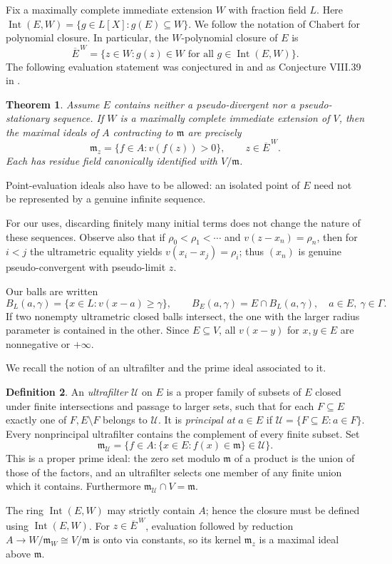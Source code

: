 \documentclass[11pt]{amsart}
\newtheorem{theorem}{Theorem}[section]
\theoremstyle{definition}
\newtheorem{definition}[theorem]{Definition}
\theoremstyle{remark}
\newcommand{\Int}{\operatorname{Int}}
\newcommand{\m}{\mathfrak m}
\newcommand{\U}{\mathcal U}
\newcommand{\g}{\Gamma}
\newcommand{\barE}{\overline E^{\,W}}
\begin{document}
Fix a maximally complete immediate extension $W$ with fraction field
$L$. Here
$\Int(E,W)=\{g\in L[X]:g(E)\subseteq W\}$.
We follow the notation of Chabert \cite[Definition~VII.1]{Chabert2025} for polynomial closure. In particular,
the $W$-polynomial closure of $E$ is
\[
\overline E^{\,W}=\{z\in W:g(z)\in W\text{ for all }
g\in\Int(E,W)\}.
\]
The following evaluation statement was conjectured in
\cite[\S3]{BoulangerChabert2020}
and as Conjecture VIII.39 in \cite{Chabert2025}.
\begin{theorem}\label{thm:valuation-main}
Assume $E$ contains neither a pseudo-divergent nor a
pseudo-stationary sequence. If $W$ is a maximally complete
immediate extension of $V$, then the maximal ideals of $A$
contracting to $\mathfrak m$ are precisely
\[
\mathfrak m_z=\{f\in A:v(f(z))>0\},\qquad z\in\overline E^{\,W}.
\]
Each has residue field canonically identified with $V/\mathfrak m$.
\end{theorem}
Point-evaluation ideals also have to be allowed: an isolated point
of $E$ need not be represented by a genuine infinite sequence.




For our uses, discarding finitely many initial terms does not change the nature of these sequences. Observe also that if $\rho_0<\rho_1<\cdots$ and $v(z-x_n)=\rho_n$, then for $i<j$ the ultrametric equality yields $v(x_i-x_j)=\rho_i$; thus $(x_n)$ is genuine pseudo-convergent with pseudo-limit $z$.


Our balls are written
\[
 B_L(a,\gamma)=\{x\in L:v(x-a)\geq\gamma\},\qquad
 B_E(a,\gamma)=E\cap B_L(a,\gamma),\quad a\in E,\ \gamma\in\g.
\]
If two nonempty ultrametric closed balls intersect, the one with the larger radius parameter is contained in the other. Since $E\subseteq V$, all $v(x-y)$ for $x,y\in E$ are nonnegative or $+\infty$.


We recall the notion of an ultrafilter and the prime ideal associated to it.
\begin{definition}
An \emph{ultrafilter} $\U$ on $E$ is a proper family of subsets of $E$ closed under finite intersections and passage to larger sets, such that for each $F\subseteq E$ exactly one of $F,E\setminus F$ belongs to $\U$. It is \emph{principal at} $a\in E$ if $\U=\{F\subseteq E:a\in F\}$. Every nonprincipal ultrafilter contains the complement of every finite subset. Set
\[
 \m_{\U}=\bigl\{f\in A:\{x\in E:f(x)\in\m\}\in\U\bigr\}.
\]
This is a proper prime ideal: the zero set modulo $\m$ of a product is the union of those of the factors, and an ultrafilter selects one member of any finite union which it contains. Furthermore $\m_{\U}\cap V=\m$.
\end{definition}
The ring $\Int(E,W)$ may strictly contain $A$; hence the closure
must be defined using $\Int(E,W)$.
For $z\in\barE$, evaluation followed by reduction
$A\to W/\m_W\cong V/\m$ is onto via constants, so its kernel
$\m_z$ is a maximal ideal above $\m$.
\end{document}
